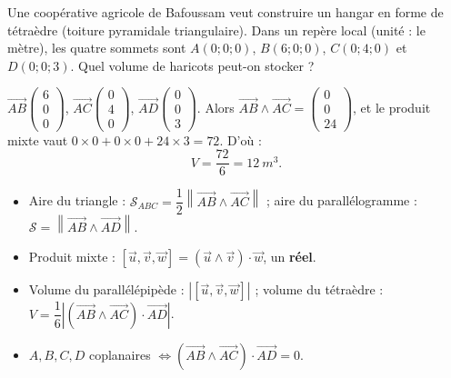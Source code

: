 \documentclass[11pt]{article}
\begin{document}
\begin{exemplebox}
Une coopérative agricole de Bafoussam veut construire un hangar en forme de tétraèdre (toiture pyramidale triangulaire). Dans un repère local (unité : le mètre), les quatre sommets sont $A(0;0;0)$, $B(6;0;0)$, $C(0;4;0)$ et $D(0;0;3)$. Quel volume de haricots peut-on stocker ?

$\overrightarrow{AB}\begin{pmatrix} 6 \\ 0 \\ 0 \end{pmatrix}$, $\overrightarrow{AC}\begin{pmatrix} 0 \\ 4 \\ 0 \end{pmatrix}$, $\overrightarrow{AD}\begin{pmatrix} 0 \\ 0 \\ 3 \end{pmatrix}$. Alors $\overrightarrow{AB} \wedge \overrightarrow{AC} = \begin{pmatrix} 0 \\ 0 \\ 24 \end{pmatrix}$, et le produit mixte vaut $0 \times 0 + 0 \times 0 + 24 \times 3 = 72$. D'où :
\[ V = \frac{72}{6} = \SI{12}{m^3}. \]
\end{exemplebox}

\begin{aretenir}
\begin{itemize}
\item Aire du triangle : $\mathcal{S}_{ABC} = \dfrac{1}{2}\left\|\overrightarrow{AB} \wedge \overrightarrow{AC}\right\|$ ; aire du parallélogramme : $\mathcal{S} = \left\|\overrightarrow{AB} \wedge \overrightarrow{AD}\right\|$.
\item Produit mixte : $[\vec{u},\vec{v},\vec{w}] = (\vec{u} \wedge \vec{v}) \cdot \vec{w}$, un \textbf{réel}.
\item Volume du parallélépipède : $|[\vec{u},\vec{v},\vec{w}]|$ ; volume du tétraèdre : $V = \dfrac{1}{6}\left|(\overrightarrow{AB}\wedge\overrightarrow{AC})\cdot\overrightarrow{AD}\right|$.
\item $A, B, C, D$ coplanaires $\iff (\overrightarrow{AB}\wedge\overrightarrow{AC})\cdot\overrightarrow{AD} = 0$.
\end{itemize}
\end{aretenir}
\end{document}
